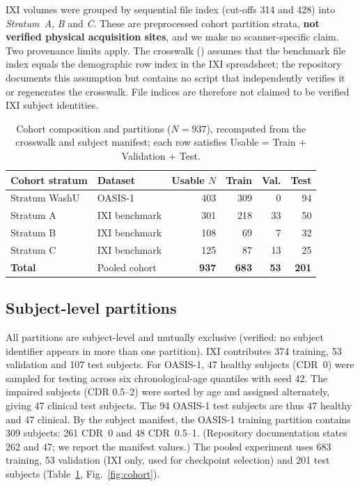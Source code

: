 \documentclass[runningheads]{llncs}
\begin{document}
IXI volumes were grouped by sequential file index (cut-offs 314 and 428) into \emph{Stratum~A}, \emph{B} and \emph{C}. These are preprocessed cohort partition strata, \textbf{not verified physical acquisition sites}, and we make no scanner-specific claim. Two provenance limits apply. The crosswalk () assumes that the benchmark file index equals the demographic row index in the IXI spreadsheet; the repository documents this assumption but contains no script that independently verifies it or regenerates the crosswalk. File indices are therefore not claimed to be verified IXI subject identities.

\begin{table}[t]
\centering
\caption{Cohort composition and partitions ($N=937$), recomputed from the crosswalk and subject manifest; each row satisfies Usable = Train + Validation + Test.}
\label{tab:cohort}
\begin{tabularx}{\textwidth}{l l r r r r}
\toprule
\textbf{Cohort stratum} & \textbf{Dataset} & \textbf{Usable $N$} & \textbf{Train} & \textbf{Val.} & \textbf{Test} \\
\midrule
Stratum WashU & OASIS-1 & 403 & 309 & 0 & 94 \\
Stratum A & IXI benchmark & 301 & 218 & 33 & 50 \\
Stratum B & IXI benchmark & 108 & 69 & 7 & 32 \\
Stratum C & IXI benchmark & 125 & 87 & 13 & 25 \\
\midrule
\textbf{Total} & Pooled cohort & \textbf{937} & \textbf{683} & \textbf{53} & \textbf{201} \\
\bottomrule
\end{tabularx}
\end{table}

\subsection{Subject-level partitions}
All partitions are subject-level and mutually exclusive (verified: no subject identifier appears in more than one partition). IXI contributes 374 training, 53 validation and 107 test subjects. For OASIS-1, 47 healthy subjects (CDR~0) were sampled for testing across six chronological-age quantiles with seed 42. The impaired subjects (CDR 0.5--2) were sorted by age and assigned alternately, giving 47 clinical test subjects. The 94 OASIS-1 test subjects are thus 47 healthy and 47 clinical. By the subject manifest, the OASIS-1 training partition contains 309 subjects: 261 CDR~0 and 48 CDR~0.5--1. (Repository documentation states 262 and 47; we report the manifest values.) The pooled experiment uses 683 training, 53 validation (IXI only, used for checkpoint selection) and 201 test subjects (Table~\ref{tab:cohort}, Fig.~\ref{fig:cohort}).
\end{document}
